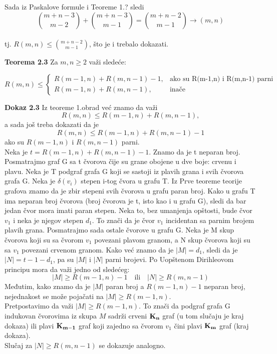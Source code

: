 \documentclass[12pt,a4paper]{article}
\begin{document}
	Sada iz Paskalove formule i Teoreme 1.? sledi 
	\[{m+n-3\choose m-2}+{m+n-3\choose m-1}={m+n-2\choose m-1}\rightarrow (m,n)\] 
	\\
	\vspace{0.7em} tj. $R(m,n) \leq {m+n-2\choose m-1}$, što je i trebalo dokazati. 
	
	{\noindent\fontsize{12pt}{12pt}\textbf{Teorema 2.3}}
	Za $m,n\geq 2$  važi sledeće:
	
	\[
   	 R(m,n)\leq 
		\begin{cases}
    		R(m-1,n)+R(m,n-1)-1,& \text{ako su R(m-1,n) i R(m,n-1) parni}\\
    	R(m-1,n)+R(m,n-1),      & \text{inače}
	\end{cases}
	\]
	
	{\noindent\fontsize{12pt}{12pt}\textbf{Dokaz 2.3}}
	Iz teoreme 1.obrad već znamo da važi
	\[R(m,n)\leq R(m-1,n)+R(m,n-1),\]
	a sada još treba dokazati da je
	\[R(m,n)\leq R(m-1,n)+R(m,n-1)-1\] 
	ako su $R(m-1,n)$ i $R(m,n-1)$ parni.
	\vspace{0.5em}
	\\
	\noindent Neka je $t=R(m-1,n)+R(m,n-1)-1$.
	Znamo da je t neparan broj. Posmatrajmo graf G sa t čvorova čije su grane obojene u dve boje: crvenu i plavu. Neka je T podgraf grafa G koji se sastoji iz plavih grana i svih čvorova grafa G. Neka je $\delta(v_i)$ stepen i-tog čvora u grafu T. Iz Prve teoreme teorije grafova znamo da je zbir stepeni svih čvorova u grafu paran broj. Kako u grafu T ima neparan broj čvorova (broj čvorova je t, isto kao i u grafu G), sledi da bar jedan čvor mora imati paran stepen. Neka to, bez umanjenja opštosti, bude čvor $v_1$ i neka je njegov stepen $d_1$. To znači da je čvor $v_1$ incidentan sa parnim brojem plavih grana. Posmatrajmo sada ostale čvorove u grafu G. Neka je M skup čvorova koji su sa čvorom $v_1$ povezani plavom granom, a N skup čvorova koji su sa $v_1$ povezani crvenom granom. Kako već znamo da je $|M| = d_1$,  sledi da je $|N| = t-1-d_1$, pa su $|M|$ i $|N|$ parni brojevi. Po Uopštenom Dirihleovom principu mora da važi jedno od sledećeg:
	\[|M|\geq R(m-1,n)-1 \quad \text{ili} \quad  |N|\geq R(m,n-1)\] 
	Međutim, kako znamo da je $|M|$ paran broj a $R(m-1,n)-1$ neparan broj, nejednakost se može pojačati na $|M|\geq R(m-1,n)$. \\
	Pretpostavimo da važi $|M|\geq R(m-1,n)$. To znači da podgraf grafa G indukovan čvorovima iz skupa $M$ sadrži crveni $\bf K_n$ graf (u tom slučaju je kraj dokaza) ili plavi $\bf K_{m-1}$ graf koji zajedno sa čvorom $v_1$ čini plavi $\bf K_{m}$ graf (kraj dokaza).\\
	Slučaj za $|N|\geq R(m,n-1)$ se dokazuje analogno.
	
\end{document}
